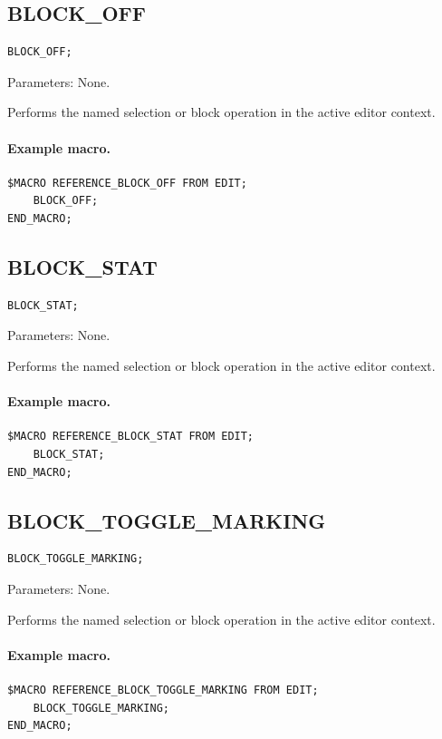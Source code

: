 \documentclass[a4paper,10pt,twoside,openany]{book}
\newenvironment{mrmacextension}{\begin{changebar}}{\end{changebar}}
\begin{document}
\label{prim:procedure-block-off}
\subsection*{BLOCK\_OFF}
\begin{verbatim}
BLOCK_OFF;
\end{verbatim}
Parameters: None.

Performs the named selection or block operation in the active editor context.

\paragraph{Example macro.}
\begin{verbatim}
$MACRO REFERENCE_BLOCK_OFF FROM EDIT;
    BLOCK_OFF;
END_MACRO;
\end{verbatim}

\label{prim:procedure-block-stat}
\subsection*{BLOCK\_STAT}
\begin{verbatim}
BLOCK_STAT;
\end{verbatim}
Parameters: None.

Performs the named selection or block operation in the active editor context.

\paragraph{Example macro.}
\begin{verbatim}
$MACRO REFERENCE_BLOCK_STAT FROM EDIT;
    BLOCK_STAT;
END_MACRO;
\end{verbatim}

\begin{mrmacextension}
\label{prim:procedure-block-toggle-marking}
\subsection*{BLOCK\_TOGGLE\_MARKING}
\begin{verbatim}
BLOCK_TOGGLE_MARKING;
\end{verbatim}
Parameters: None.

Performs the named selection or block operation in the active editor context.

\paragraph{Example macro.}
\begin{verbatim}
$MACRO REFERENCE_BLOCK_TOGGLE_MARKING FROM EDIT;
    BLOCK_TOGGLE_MARKING;
END_MACRO;
\end{verbatim}
\end{mrmacextension}
\end{document}
